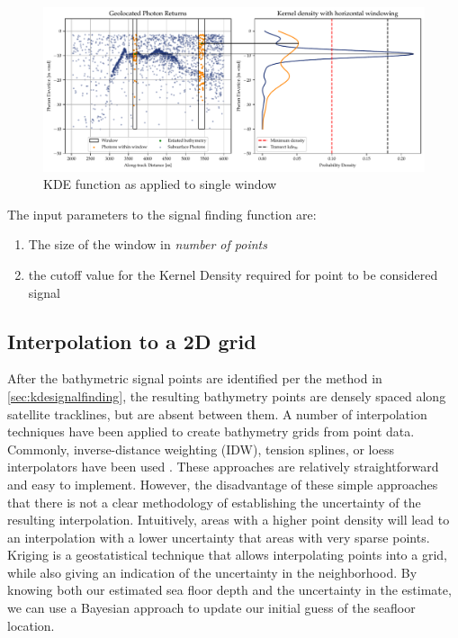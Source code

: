 \begin{figure}[htbp]
    \centering
    \includegraphics[width=\textwidth]{figures/2d_kde_plot.pdf}
    \caption{KDE function as applied to single window}
    \label{fig:kdefunc}
\end{figure}

The input parameters to the signal finding function are:

\begin{enumerate}
    \item The size of the window in \emph{number of points}
    \item the cutoff value for the Kernel Density required for point to be considered signal
\end{enumerate}

\subsection{Interpolation to a 2D grid}

After the bathymetric signal points are identified per the method in \ref{sec:kdesignalfinding}, the resulting bathymetry points are densely spaced along satellite tracklines, but are absent between them. A number of interpolation techniques have been applied to create bathymetry grids from point data. Commonly, inverse-distance weighting (IDW), tension splines, or loess interpolators have been used \parencite{gebcocookbook,Ferreira2017}. These approaches are relatively straightforward and easy to implement. However, the disadvantage of these simple approaches that there is not a clear methodology of establishing the uncertainty of the resulting interpolation. Intuitively, areas with a higher point density will lead to an interpolation with a lower uncertainty that areas with very sparse points. Kriging is a geostatistical technique that allows interpolating points into a grid, while also giving an indication of the uncertainty in the neighborhood. By knowing both our estimated sea floor depth and the uncertainty in the estimate, we can use a Bayesian approach to update our initial guess of the seafloor location.


